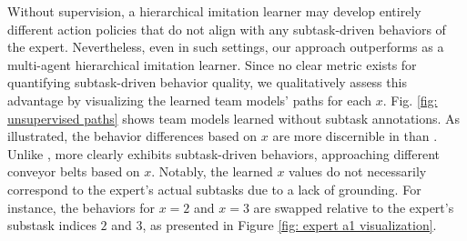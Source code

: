 Without supervision, a hierarchical imitation learner may develop entirely different action policies that do not align with any subtask-driven behaviors of the expert. Nevertheless, even in such settings, our approach outperforms \maogail as a multi-agent hierarchical imitation learner. Since no clear metric exists for quantifying subtask-driven behavior quality, we qualitatively assess this advantage by visualizing the learned team models' paths for each $x$. Fig. \ref{fig: unsupervised paths} shows team models learned without subtask annotations. As illustrated, the behavior differences based on $x$ are more discernible in \ouralg than \maogail. Unlike \maogail, \ouralg more clearly exhibits subtask-driven behaviors, approaching different conveyor belts based on $x$. Notably, the learned $x$ values do not necessarily correspond to the expert's actual subtasks due to a lack of grounding. For instance, the behaviors for $x=2$ and $x=3$ are swapped relative to the expert's substask indices $2$ and $3$, as presented in Figure \ref{fig: expert a1 visualization}.



